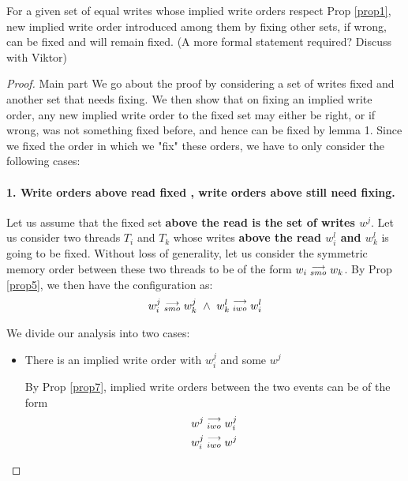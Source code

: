 
        \begin{lemma}
            \label{iwo-lemma2}
            For a given set of equal writes whose implied write orders respect Prop \ref{prop1}, new implied write order introduced among them by fixing other sets, if wrong, can be fixed and will remain fixed. 
            (A more formal statement required? Discuss with Viktor)        
        \end{lemma}

        \begin{proof}{Main part}
            We go about the proof by considering a set of writes fixed and another set that needs fixing. 
            We then show that on fixing an implied write order, any new implied write order to the fixed set may either be right, or if wrong, was not something fixed before, and hence can be fixed by lemma 1. 
            Since we fixed the order in which we "fix" these orders, we have to only consider the following cases:
            \paragraph{1. Write orders above read fixed , write orders above still need fixing.}

                Let us assume that the fixed set \textbf{above the read is the set of writes $w^j$}. Let us consider two threads $T_i$ and $T_k$ whose writes \textbf{above the read $w_i^l$ and $w_k^l$} is going to be fixed. Without loss of generality, let us consider the symmetric memory order between these two threads to be of the form $w_i\stackrel{\longrightarrow}{_{smo}}w_k$.  By Prop \ref{prop5}, we then have the configuration as:
                \begin{align*}
                    \reln{w_i^j}{smo}{w_k^j} \ \wedge \ \reln{w_k^l}{iwo}{w_i^l}
                \end{align*}

                We divide our analysis into two cases: 
                
                \begin{itemize}
                    \item There is an implied write order with $w_i^j$ and some $w^j$

                        By Prop \ref{prop7}, implied write orders between the two events can be of the form 
                        \begin{align*}
                            w^j\stackrel{\longrightarrow}{_{iwo}}w_i^j \\
                            w_i^j\stackrel{\longrightarrow}{_{iwo}}w^j
                        \end{align*}


\end{itemize}
\end{proof}
